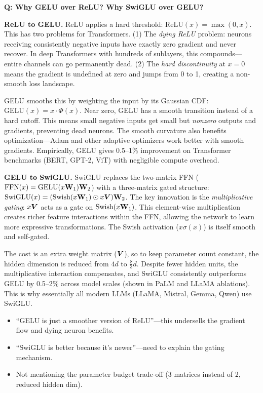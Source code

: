 \begin{interviewq}
\textbf{Q: Why GELU over ReLU? Why SwiGLU over GELU?}

 \quad {} \quad \badgefreq{\freqhigh}

\stronganswer

\textbf{ReLU to GELU.} ReLU applies a hard threshold: $\text{ReLU}(x) = \max(0,x)$. This has two problems for Transformers. (1) The \textit{dying ReLU} problem: neurons receiving consistently negative inputs have exactly zero gradient and never recover. In deep Transformers with hundreds of sublayers, this compounds---entire channels can go permanently dead. (2) The \textit{hard discontinuity} at $x=0$ means the gradient is undefined at zero and jumps from 0 to 1, creating a non-smooth loss landscape.

GELU smooths this by weighting the input by its Gaussian CDF: $\text{GELU}(x) = x \cdot \Phi(x)$. Near zero, GELU has a smooth transition instead of a hard cutoff. This means small negative inputs get small but \textit{nonzero} outputs and gradients, preventing dead neurons. The smooth curvature also benefits optimization---Adam and other adaptive optimizers work better with smooth gradients. Empirically, GELU gives 0.5--1\% improvement on Transformer benchmarks (BERT, GPT-2, ViT) with negligible compute overhead.

\textbf{GELU to SwiGLU.} SwiGLU replaces the two-matrix FFN ($\text{FFN}(x) = \text{GELU}(x\mathbf{W}_1)\mathbf{W}_2$) with a three-matrix gated structure: $\text{SwiGLU}(x) = (\text{Swish}(x\mathbf{W}_1) \odot x\bm{V})\mathbf{W}_2$. The key innovation is the \textit{multiplicative gating}: $x\bm{V}$ acts as a gate on $\text{Swish}(x\mathbf{W}_1)$. This element-wise multiplication creates richer feature interactions within the FFN, allowing the network to learn more expressive transformations. The Swish activation ($x\sigma(x)$) is itself smooth and self-gated.

The cost is an extra weight matrix ($\bm{V}$), so to keep parameter count constant, the hidden dimension is reduced from $4d$ to $\frac{8}{3}d$. Despite fewer hidden units, the multiplicative interaction compensates, and SwiGLU consistently outperforms GELU by 0.5--2\% across model scales (shown in PaLM and LLaMA ablations). This is why essentially all modern LLMs (LLaMA, Mistral, Gemma, Qwen) use SwiGLU.

\redflags
\begin{itemize}
    \item ``GELU is just a smoother version of ReLU''---this undersells the gradient flow and dying neuron benefits.
    \item ``SwiGLU is better because it's newer''---need to explain the gating mechanism.
    \item Not mentioning the parameter budget trade-off (3 matrices instead of 2, reduced hidden dim).
\end{itemize}


\end{interviewq}
